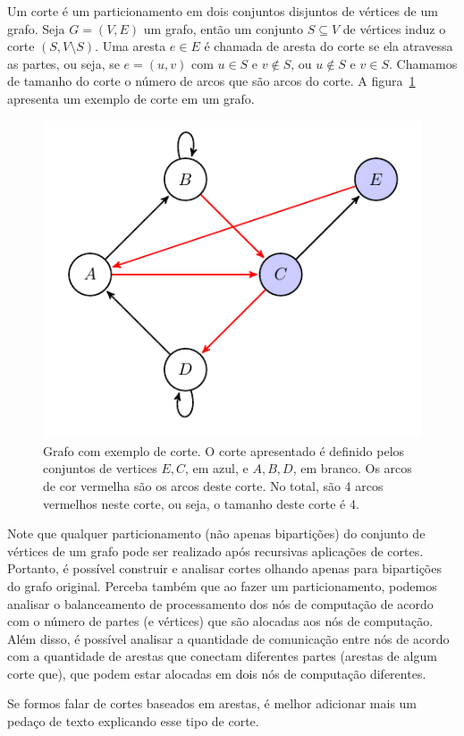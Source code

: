 \documentclass[conference]{IEEEtran}
\begin{document}
Um corte é um particionamento em dois conjuntos disjuntos de vértices de
um grafo. Seja $G = (V, E)$ um grafo, então um conjunto $S \subseteq V$ 
de vértices induz o corte $(S, V \setminus S)$. Uma aresta $e \in E$ é
chamada de aresta do corte se ela atravessa as partes, ou seja, se
$e = (u, v)$ com $u \in S$ e $v \notin S$, ou $u \notin S$ e $v \in S$.
Chamamos de tamanho do corte o número de arcos que são arcos do corte. A
figura~\ref{fig:example_cut} apresenta um exemplo de corte em um grafo.

\begin{figure}
    \begin{center}
        \includegraphics[width=.5\textwidth]{fund_conc/cut_example.pdf}
    \end{center}
    \caption{Grafo com exemplo de corte. O corte apresentado é definido
    pelos conjuntos de vertices ${E, C}$, em azul, e $A, B, D$, em 
    branco. Os arcos de cor vermelha são os arcos deste corte. No total,
    são 4 arcos vermelhos neste corte, ou seja, o tamanho deste corte
    é 4.}
    \label{fig:example_cut}
\end{figure}

Note que qualquer particionamento (não apenas bipartições) do conjunto 
de vértices de um grafo pode ser realizado após recursivas aplicações de 
cortes. Portanto, é possível construir e analisar cortes olhando apenas
para bipartições do grafo original. Perceba também que ao fazer um 
particionamento, podemos analisar o balanceamento de processamento 
dos nós de computação de acordo com o número de partes (e vértices) 
que são alocadas aos nós de computação. Além disso, é possível analisar
a quantidade de comunicação entre nós de acordo com a quantidade de
arestas que conectam diferentes partes (arestas de algum corte que), 
que podem estar alocadas em dois nós de computação diferentes.

{\color{blue} Se formos falar de cortes baseados em arestas, é melhor
adicionar mais um pedaço de texto explicando esse tipo de corte.}
\end{document}
